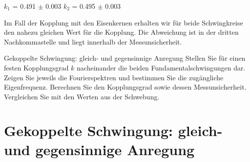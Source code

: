 \documentclass[twoside]{protokoll}
\begin{document}
\begin{center}
$k_1$ = 0.491 $\pm$ 0.003 \qquad $k_2$ = 0.495 $\pm$ 0.003
\end{center}

Im Fall der Kopplung mit den Eisenkernen erhalten wir für beide Schwingkreise den nahezu gleichen Wert für die Kopplung.
Die Abweichung ist in der dritten Nachkommastelle und liegt innerhalb der Messunsicherheit.

\begin{aufgabe}{Gekoppelte Schwingung: gleich- und gegensinnige Anregung}
  Stellen Sie für einen festen Kopplungsgrad $k$ nacheinander die
  beiden Fundamentalschwingungen dar. Zeigen Sie jeweils die
  Fourierspektren und bestimmen Sie die zugängliche
  Eigenfrequenz. Berechnen Sie den Kopplungsgrad sowie dessen
  Messunsicherheit. Vergleichen Sie mit den Werten aus der Schwebung.
\end{aufgabe}

\section{Gekoppelte Schwingung: gleich- und gegensinnige Anregung}
\end{document}
